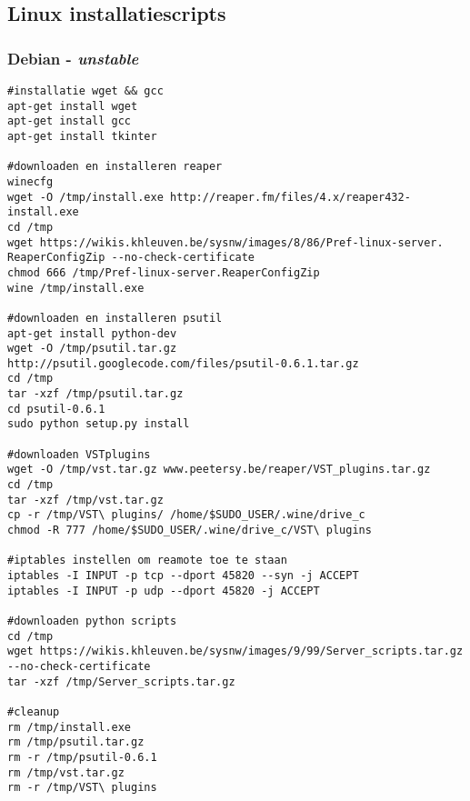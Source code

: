 \documentclass[DIV=calc]{scrartcl}
\begin{document}
\subsection{Linux installatiescripts}
\subsubsection{Debian - \textit{unstable}}
\begin{lstlisting}[caption={Script-debian-32bit.sh}, label=Debian installatiescript 32bit]
#installatie wget && gcc
apt-get install wget
apt-get install gcc
apt-get install tkinter
 
#downloaden en installeren reaper
winecfg
wget -O /tmp/install.exe http://reaper.fm/files/4.x/reaper432-install.exe
cd /tmp
wget https://wikis.khleuven.be/sysnw/images/8/86/Pref-linux-server.
ReaperConfigZip --no-check-certificate
chmod 666 /tmp/Pref-linux-server.ReaperConfigZip
wine /tmp/install.exe
 
#downloaden en installeren psutil
apt-get install python-dev
wget -O /tmp/psutil.tar.gz 
http://psutil.googlecode.com/files/psutil-0.6.1.tar.gz
cd /tmp
tar -xzf /tmp/psutil.tar.gz
cd psutil-0.6.1
sudo python setup.py install
 
#downloaden VSTplugins
wget -O /tmp/vst.tar.gz www.peetersy.be/reaper/VST_plugins.tar.gz
cd /tmp
tar -xzf /tmp/vst.tar.gz
cp -r /tmp/VST\ plugins/ /home/$SUDO_USER/.wine/drive_c
chmod -R 777 /home/$SUDO_USER/.wine/drive_c/VST\ plugins
 
#iptables instellen om reamote toe te staan
iptables -I INPUT -p tcp --dport 45820 --syn -j ACCEPT
iptables -I INPUT -p udp --dport 45820 -j ACCEPT
 
#downloaden python scripts
cd /tmp
wget https://wikis.khleuven.be/sysnw/images/9/99/Server_scripts.tar.gz 
--no-check-certificate
tar -xzf /tmp/Server_scripts.tar.gz
 
#cleanup
rm /tmp/install.exe
rm /tmp/psutil.tar.gz
rm -r /tmp/psutil-0.6.1
rm /tmp/vst.tar.gz
rm -r /tmp/VST\ plugins
\end{lstlisting}
\end{document}
